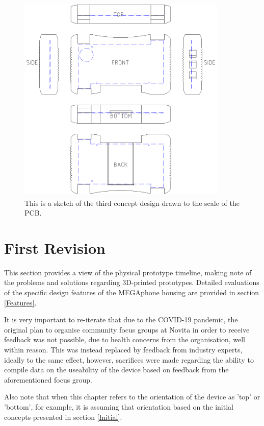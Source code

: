 \begin{figure} [h]
\centering
\includegraphics[width=10cm,height=10cm,keepaspectratio]{Figures/design3_sketch.png}
\caption{This is a sketch of the third concept design drawn to the scale of the PCB.}
\label{fig:Design_3}
\end{figure}

\section{First Revision} \label{First Revision}

This section provides a view of the physical prototype timeline, making note of the problems and solutions regarding 3D-printed prototypes.
Detailed evaluations of the specific design features of the MEGAphone housing are provided in section \ref{Features}.

It is very important to re-iterate that due to the COVID-19 pandemic, the original plan to organise community focus groups at Novita \cite{novita} in order to receive feedback was not possible, due to health concerns from the organisation, well within reason.
This was instead replaced by feedback from industry experts, ideally to the same effect, however, sacrifices were made regarding the ability to compile data on the useability of the device based on feedback from the aforementioned focus group.

Also note that when this chapter refers to the orientation of the device as 'top' or 'bottom', for example, it is assuming that orientation based on the initial concepts presented in section \ref{Initial}.

